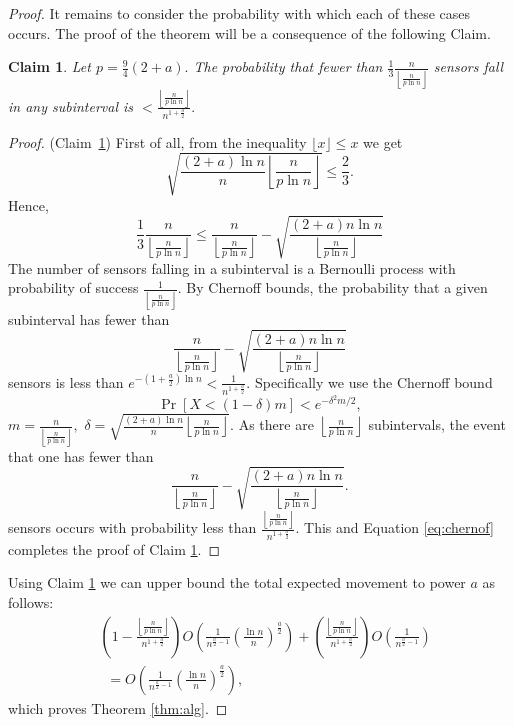 \documentclass[final,5p,times,twocolumn]{elsarticle_mod}
\newtheorem{Claim}[theorem]{Claim}
\begin{document}
\begin{proof}
It remains to consider the probability with which each of these cases occurs. The proof of the theorem will be a consequence of the following Claim.
\begin{Claim}
\label{claim:first}
Let $p=\frac{9}{4}(2+a).$
 The probability that fewer than 
 $\frac{1}{3}\frac{n}{\left\lfloor\frac{n}{p\ln n}\right\rfloor}$ 
sensors fall in any subinterval is
 $<\frac{\left\lfloor\frac{n}{p\ln n}\right\rfloor}{n^{1+\frac{a}{2}}}.$
\end{Claim}
\begin{proof} (Claim~\ref{claim:first})
First of all, from the inequality $\lfloor x\rfloor \le x$ we get
$$\sqrt{\frac{(2+a)\ln n}{n}\left\lfloor\frac{n}{p\ln n}\right\rfloor}\le \frac{2}{3}.$$ 
Hence,
\begin{equation}
\label{eq:chernof}
\frac{1}{3}\frac{n}{\left\lfloor\frac{n}{p\ln n}\right\rfloor}\le
\frac{n}{\left\lfloor\frac{n}{p\ln n}\right\rfloor}-\sqrt{\frac{(2+a)n \ln n  }{\left\lfloor\frac{n}{p\ln n}\right\rfloor}}
\end{equation}
The number of sensors falling in a subinterval is a Bernoulli process with probability of success $\frac{1}{\left\lfloor\frac{n}{p\ln n}\right\rfloor}.$ By Chernoff bounds, the probability
that a given subinterval has fewer than 
$$
\frac{n}{\left\lfloor\frac{n}{p\ln n}\right\rfloor}-\sqrt{\frac{(2+a)n\ln n }{\left\lfloor\frac{n}{p\ln n}\right\rfloor}}
$$ 
sensors is less than 
$e^{-\left(1+\frac{a}{2}\right)\ln n}<\frac{1}{n^{1+\frac{a}{2}}}.$ 
Specifically we use the Chernoff bound 
$$\Pr[X<(1-\delta)m]<e^{-{\delta}^2m/2},$$
$m=\frac{n}{\left\lfloor\frac{n}{p\ln n}\right\rfloor},$
$\delta=\sqrt{\frac{(2+a)\ln n}{n}\left\lfloor\frac{n}{p\ln n}\right\rfloor}.$
As there are $\left\lfloor\frac{n}{p\ln n}\right\rfloor$ subintervals, the event that one has fewer than 
$$
\frac{n}{\left\lfloor\frac{n}{p\ln n}\right\rfloor}-\sqrt{\frac{(2+a)n\ln n }{\left\lfloor\frac{n}{p\ln n}\right\rfloor}}.
$$
sensors occurs with probability less than $\frac{\left\lfloor\frac{n}{p\ln n}\right\rfloor}{n^{1+\frac{a}{2}}}.$ This and Equation \eqref{eq:chernof} completes the proof of Claim \ref{claim:first}. 
\end{proof}
Using Claim  \ref{claim:first} we can upper bound the total expected movement to power $a$ as follows:
\begin{align*}
&\left(1-\frac{\left\lfloor\frac{n}{p\ln n}\right\rfloor}{n^{1+\frac{a}{2}}}\right)
O\left(\frac{1}{n^{\frac{a}{2}-1}}\left(\frac{\ln n}{n}\right)^{\frac{a}{2}}\right)
+\left(\frac{\left\lfloor\frac{n}{p\ln n}\right\rfloor}{n^{1+\frac{a}{2}}}\right)O\left(\frac{1}{n^{\frac{a}{2}-1}}\right)\\
&\,\,\,=
O\left(\frac{1}{n^{\frac{a}{2}-1}}\left(\frac{\ln n}{n}\right)^{\frac{a}{2}}\right),
\end{align*}
which proves Theorem \ref{thm:alg}. 
\end{proof}
\end{document}

